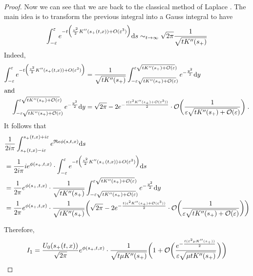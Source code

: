 \documentclass[11pt]{amsart}
\renewcommand{\Re}{\mathfrak{R}e}
\begin{document}
\begin{proof}
Now we can see that we are back to the classical method of Laplace \cite{laplace1986memoir}. The main idea is to transform the previous integral into a Gauss integral to have
    \begin{equation}
    \int_{- \varepsilon}^{\varepsilon} e^{- t \Big(\frac{v^2}{2} K''(s_+(t,x)) + O(\varepsilon^3)\Big)} \mathrm ds 
    \sim_{t \to \infty}
    \sqrt{2\pi} \frac{1}{\sqrt{tK''(s_+)}}
    \end{equation}
Indeed, 
\begin{align*}
    \int_{- \varepsilon}^{\varepsilon} e^{- t \Big(\frac{v^2}{2} K''(s_+(t,x)) + O(\varepsilon^3)\Big)} 
    &= 
     \frac{1}{\sqrt{tK''(s_+)}} \int_{- \varepsilon \sqrt{tK''(s_+) + \mathcal{O}(\varepsilon})}^{\varepsilon \sqrt{tK''(s_+) + \mathcal{O}(\varepsilon})} e^{- \frac{y^2}{2}}\mathrm dy \\
     \intertext{and}
     \int_{- \varepsilon \sqrt{tK''(s_+) + \mathcal{O}(\varepsilon})}^{\varepsilon \sqrt{tK''(s_+) + \mathcal{O}(\varepsilon})} e^{- \frac{y^2}{2}}\mathrm dy &= 
    \sqrt{2\pi} - 2 e^{-\frac{t(\varepsilon^2 K''(s_+) + \mathcal{O}(\varepsilon^3))}{2}} \cdot \mathcal{O}\bigg(\frac{1 }{\varepsilon \sqrt{tK''(s_+) + \mathcal{O}(\varepsilon})}\bigg)
    \; .
\end{align*}
It follows that 
    \begin{align*}
     &\frac{1}{2i\pi}   \int_{s_+(t,x) - i\varepsilon}^{s_+(t,x) + i\varepsilon} e^{\Re \phi(s,t,x)} \ds \\
     &= 
     \frac{1}{2i\pi} i e^{\phi(s_+, t, x)} \cdot \int_{- \varepsilon}^{\varepsilon} e^{- t \Big(\frac{v^2}{2} K''(s_+(t,x)) + O(\varepsilon^3)\Big)} \ds  \\
     &= 
      \frac{1}{2\pi} e^{\phi(s_+, t, x)} \cdot \frac{1}{\sqrt{tK''(s_+)}} \int_{- \varepsilon \sqrt{tK''(s_+) + \Ocal(\varepsilon})}^{\varepsilon \sqrt{tK''(s_+) + \Ocal(\varepsilon})} e^{- \frac{y^2}{2}}\dy \\
     &=
    \frac{1}{2\pi} e^{\phi(s_+, t, x)} \cdot \frac{1}{\sqrt{tK''(s_+)}} \bigg( 
    \sqrt{2\pi} - 2 e^{-\frac{t(\varepsilon^2 K''(s_+) + \Ocal(\varepsilon^3))}{2}} \cdot \Ocal\bigg(\frac{1 }{\varepsilon \sqrt{tK''(s_+) + \Ocal(\varepsilon})}\bigg) \bigg) \\
    \end{align*}
    
Therefore, 
    \begin{equation}
    I_1 = \frac{U_0(s_+(t,x))}{\sqrt{2\pi}} e^{\phi(s_+, t, x)} \cdot \frac{1}{\sqrt{t \mu K''(s_+)}} \bigg( 
    1 + \mathcal{O}\bigg(\frac{e^{-\frac{t(\varepsilon^2 \mu K''(s_+))}{2}} }{\varepsilon \sqrt{\mu tK''(s_+)}}\bigg) \bigg)\\
    \end{equation}


\end{proof}
\end{document}
